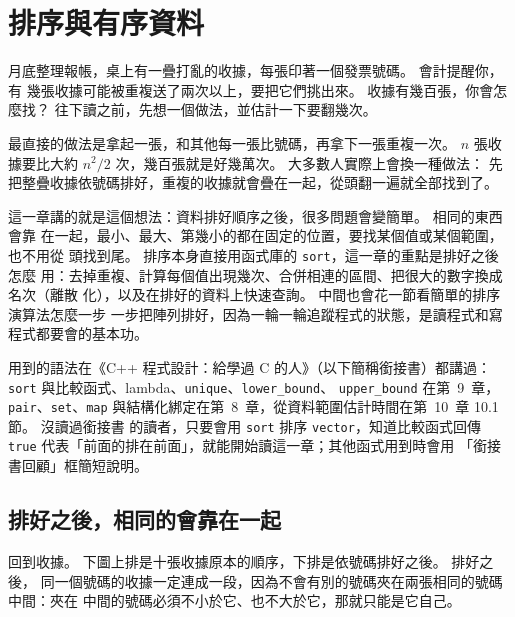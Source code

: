 \chapter{排序與有序資料}
\label{ch:sorting}

月底整理報帳，桌上有一疊打亂的收據，每張印著一個發票號碼。 會計提醒你，有
幾張收據可能被重複送了兩次以上，要把它們挑出來。 收據有幾百張，你會怎麼找？
往下讀之前，先想一個做法，並估計一下要翻幾次。

最直接的做法是拿起一張，和其他每一張比號碼，再拿下一張重複一次。 $n$ 張收
據要比大約 $n^2 / 2$ 次，幾百張就是好幾萬次。 大多數人實際上會換一種做法：
先把整疊收據依號碼排好，重複的收據就會疊在一起，從頭翻一遍就全部找到了。

這一章講的就是這個想法：資料排好順序之後，很多問題會變簡單。 相同的東西會靠
在一起，最小、最大、第幾小的都在固定的位置，要找某個值或某個範圍，也不用從
頭找到尾。 排序本身直接用函式庫的 \texttt{sort}，這一章的重點是排好之後怎麼
用：去掉重複、計算每個值出現幾次、合併相連的區間、把很大的數字換成名次（離散
化），以及在排好的資料上快速查詢。 中間也會花一節看簡單的排序演算法怎麼一步
一步把陣列排好，因為一輪一輪追蹤程式的狀態，是讀程式和寫程式都要會的基本功。

用到的語法在《C++ 程式設計：給學過 C 的人》（以下簡稱銜接書）都講過：
\texttt{sort} 與比較函式、lambda、\texttt{unique}、\texttt{lower\_bound}、
\texttt{upper\_bound} 在第~9~章，\texttt{pair}、\texttt{set}、\texttt{map}
與結構化綁定在第~8~章，從資料範圍估計時間在第~10~章 10.1 節。 沒讀過銜接書
的讀者，只要會用 \texttt{sort} 排序 \texttt{vector}，知道比較函式回傳
\texttt{true} 代表「前面的排在前面」，就能開始讀這一章；其他函式用到時會用
「銜接書回顧」框簡短說明。

\section{排好之後，相同的會靠在一起}
\label{sec:srt-adjacent}

回到收據。 下圖上排是十張收據原本的順序，下排是依號碼排好之後。 排好之後，
同一個號碼的收據一定連成一段，因為不會有別的號碼夾在兩張相同的號碼中間：夾在
中間的號碼必須不小於它、也不大於它，那就只能是它自己。

\begin{center}
\label{fig:srt-receipts}
\end{center}

